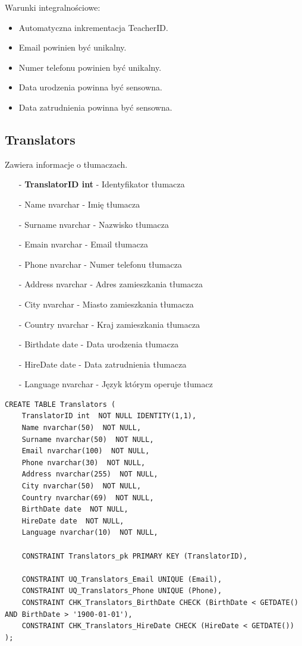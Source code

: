 \documentclass[11pt,a4paper]{article}
\begin{document}
Warunki integralnościowe:
\begin{itemize}
    \item Automatyczna inkrementacja TeacherID.
    \item Email powinien być unikalny.
    \item Numer telefonu powinien być unikalny.
    \item Data urodzenia powinna być sensowna.
    \item Data zatrudnienia powinna być sensowna.
\end{itemize}

\subsection{Translators}
Zawiera informacje o tłumaczach.

\begin{itemize}
    \item[-] \textbf{TranslatorID int} - Identyfikator tłumacza
    \item[-] Name nvarchar - Imię tłumacza
    \item[-] Surname nvarchar - Nazwisko tłumacza
    \item[-] Emain nvarchar - Email tłumacza
    \item[-] Phone nvarchar - Numer telefonu tłumacza
    \item[-] Address nvarchar - Adres zamieszkania tłumacza
    \item[-] City nvarchar - Miasto zamieszkania tłumacza
    \item[-] Country nvarchar - Kraj zamieszkania tłumacza
    \item[-] Birthdate date - Data urodzenia tłumacza
    \item[-] HireDate date - Data zatrudnienia tłumacza
    \item[-] Language nvarchar - Język którym operuje tłumacz
\end{itemize}

\begin{Verbatim}[breaklines=true]
CREATE TABLE Translators (
    TranslatorID int  NOT NULL IDENTITY(1,1),
    Name nvarchar(50)  NOT NULL,
    Surname nvarchar(50)  NOT NULL,
    Email nvarchar(100)  NOT NULL,
    Phone nvarchar(30)  NOT NULL,
    Address nvarchar(255)  NOT NULL,
    City nvarchar(50)  NOT NULL,
    Country nvarchar(69)  NOT NULL,
    BirthDate date  NOT NULL,
    HireDate date  NOT NULL,
    Language nvarchar(10)  NOT NULL,

    CONSTRAINT Translators_pk PRIMARY KEY (TranslatorID),

    CONSTRAINT UQ_Translators_Email UNIQUE (Email),
    CONSTRAINT UQ_Translators_Phone UNIQUE (Phone),
    CONSTRAINT CHK_Translators_BirthDate CHECK (BirthDate < GETDATE() AND BirthDate > '1900-01-01'),
    CONSTRAINT CHK_Translators_HireDate CHECK (HireDate < GETDATE())
);
\end{Verbatim}
\end{document}
